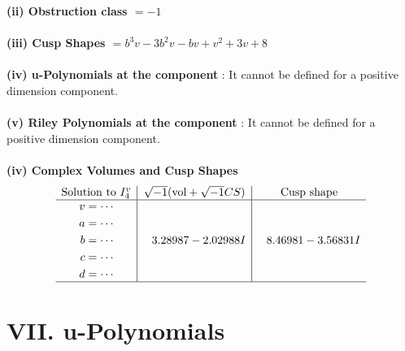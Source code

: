 \documentclass[1p]{elsarticle_modified}
\theoremstyle{definition}
\newcommand{\I}{\sqrt{-1}}
\begin{document}
\flushleft \textbf{(ii) Obstruction class $= -1$}\\~\\
\flushleft \textbf{(iii) Cusp Shapes $= b^3 v-3 b^2 v- b v+v^2+3 v+8$}\\~\\
\flushleft \textbf{(iv) u-Polynomials at the component} : It cannot be defined for a positive dimension component.\\~\\
\flushleft \textbf{(v) Riley Polynomials at the component} : It cannot be defined for a positive dimension component.\\~\\
\newpage\flushleft \textbf{(iv) Complex Volumes and Cusp Shapes}
$$\begin{array}{c|c|c} 
\text{Solution to }I^v_{4}& \I (\text{vol} + \sqrt{-1}CS) & \text{Cusp shape}\\
 \hline 
\begin{aligned}
v &= \cdots \\
a &= \cdots \\
b &= \cdots \\
c &= \cdots \\
d &= \cdots\end{aligned}
 & \phantom{-}3.28987 - 2.02988 I & \phantom{-}8.46981 - 3.56831 I\\
 \hline 
 \end{array}
$$
\newpage\renewcommand{\arraystretch}{1}
\centering \section*{ VII. u-Polynomials}
\end{document}
